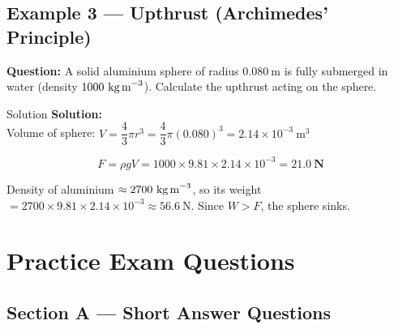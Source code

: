 \subsection*{Example 3 — Upthrust (Archimedes' Principle)}

\textbf{Question:} A solid aluminium sphere of radius $0.080\ \text{m}$ is fully submerged in water (density $1000\ \text{kg\,m}^{-3}$). Calculate the upthrust acting on the sphere.

\begin{examplebox}{Solution}
\textbf{Solution:}\\
Volume of sphere: $V = \dfrac{4}{3}\pi r^3 = \dfrac{4}{3}\pi (0.080)^3 = 2.14 \times 10^{-3}\ \text{m}^3$

$$F = \rho g V = 1000 \times 9.81 \times 2.14\times10^{-3} = \mathbf{21.0\ \text{N}}$$

Density of aluminium $\approx 2700\ \text{kg\,m}^{-3}$, so its weight $= 2700 \times 9.81 \times 2.14\times10^{-3} \approx 56.6\ \text{N}$. Since $W > F$, the sphere sinks.
\end{examplebox}

\section{Practice Exam Questions}

\subsection*{Section A — Short Answer Questions}


